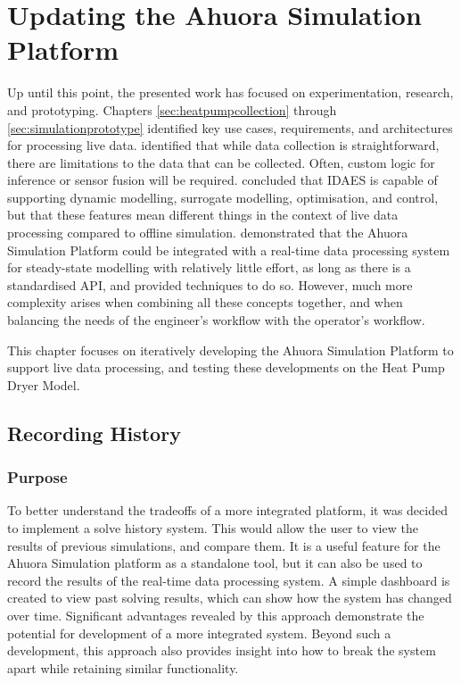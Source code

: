 \chapter{Updating the Ahuora Simulation Platform} \label{sec:history}

Up until this point, the presented work has focused on experimentation, research, and prototyping. Chapters \ref{sec:heatpumpcollection} through \ref{sec:simulationprototype} identified key use cases, requirements, and architectures for processing live data. 
 identified that while data collection is straightforward, there are limitations to the data that can be collected. Often, custom logic for inference or sensor fusion will be required.  concluded that IDAES is capable of supporting dynamic modelling, surrogate modelling, optimisation, and control, but that these features mean different things in the context of live data processing compared to offline simulation. 
 demonstrated that the Ahuora Simulation Platform could be integrated with a real-time data processing system for steady-state modelling with relatively little effort, as long as there is a standardised API, and provided techniques to do so. However, much more complexity arises when combining all these concepts together, and when balancing the needs of the engineer's workflow with the operator's workflow.

This chapter focuses on iteratively developing the Ahuora Simulation Platform to support live data processing, and testing these developments on the Heat Pump Dryer Model. 

\section{Recording History}

\subsection{Purpose}

To better understand the tradeoffs of a more integrated platform, it was decided to implement a solve history system. This would allow the user to view the results of previous simulations, and compare them. It is a useful feature for the Ahuora Simulation platform as a standalone tool, but it can also be used to record the results of the real-time data processing system. A simple dashboard is created to view past solving results, which can show how the system has changed over time. Significant advantages revealed by this approach demonstrate the potential for development of a more integrated system. Beyond such a development, this approach also provides insight into how to break the system apart while retaining similar functionality.



